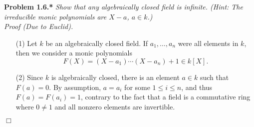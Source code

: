 \documentclass{article}
\begin{document}
\textbf{Problem 1.6.*}
\emph{Show that any algebraically closed field is infinite.
(Hint: The irreducible monic polynomials are $X - a$, $a \in k$.)} \\

\emph{Proof (Due to Euclid).}
\begin{enumerate}
\item[(1)]
  Let $k$ be an algebraically closed field.
  If $a_1, \ldots, a_n$ were all elements in $k$, then
  we consider a monic polynomials
  \[
    F(X) = (X - a_1) \cdots (X - a_n) + 1 \in k[X].
  \]

\item[(2)]
  Since $k$ is algebraically closed,
  there is an element $a \in k$ such that $F(a) = 0$.
  By assumption, $a = a_i$ for some $1 \leq i \leq n$,
  and thus $F(a) = F(a_i) = 1$, contrary to the fact that
  a field is a commutative ring where $0 \neq 1$ and all nonzero elements are invertible.
\end{enumerate}
$\Box$\\\\



\end{document}
